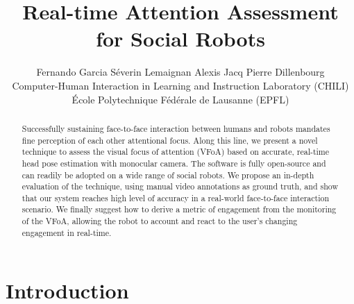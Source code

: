 \documentclass{sig-alternate}
\begin{document}
%

\title{Real-time Attention Assessment for Social Robots}
\author{Fernando Garcia \qquad Séverin Lemaignan \qquad Alexis Jacq \qquad Pierre Dillenbourg\\Computer-Human Interaction in Learning and Instruction Laboratory (CHILI)\\École Polytechnique Fédérale de Lausanne (EPFL)}


\maketitle
\begin{abstract}

Successfully sustaining face-to-face interaction between humans and robots
mandates fine perception of each other attentional focus. Along this line, we
present a novel technique to assess the visual focus of attention (VFoA) based
on accurate, real-time head pose estimation with monocular camera. The software
is fully open-source and can readily be adopted on a wide range of social
robots. We propose an in-depth evaluation of the technique, using manual video
annotations as ground truth, and show that our system reaches high level of
accuracy in a real-world face-to-face interaction scenario. We finally suggest how
to derive a metric of engagement from the monitoring of the VFoA, allowing the
robot to account and react to the user's changing engagement in real-time.

\end{abstract}




\section{Introduction}
\end{document}
